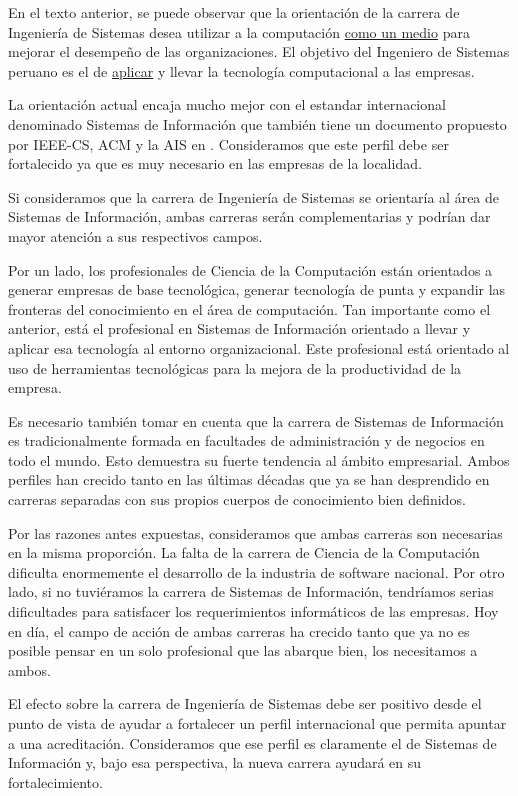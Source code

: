 En el texto anterior, se puede observar que la orientación de la carrera de Ingenierí­a de Sistemas desea utilizar a la computación \underline{como un medio} para mejorar el desempeño de las organizaciones. El objetivo del Ingeniero de Sistemas peruano es el de \underline{aplicar} y llevar la tecnologí­a computacional a las empresas.

La orientación actual encaja mucho mejor con el estandar
internacional denominado Sistemas de Información que también tiene
un documento propuesto por IEEE-CS, ACM y la \ac{AIS} en
\cite{InformationSystems2002Journal}. Consideramos que este perfil debe ser
fortalecido ya que es muy necesario en las empresas de la localidad.

Si consideramos que la carrera de Ingenierí­a de Sistemas se
orientarí­a al área de Sistemas de Información, ambas carreras serán
complementarias y podrí­an dar mayor atención a sus respectivos
campos.

Por un lado, los profesionales de Ciencia de la Computación están orientados a generar empresas
de base tecnológica, generar tecnologí­a de punta y expandir las
fronteras del conocimiento en el área de computación. Tan importante
como el anterior, está el profesional en Sistemas de Información
orientado a llevar y aplicar esa tecnologí­a al entorno organizacional. Este profesional está orientado al uso de
herramientas tecnológicas para la mejora de la productividad de la empresa.

Es necesario también tomar en cuenta que la carrera de Sistemas de Información es tradicionalmente 
formada en facultades de administración y de negocios en todo el mundo. Esto demuestra su fuerte 
tendencia al ámbito empresarial. Ambos perfiles han crecido tanto en las últimas décadas que ya se 
han desprendido en carreras separadas con sus propios cuerpos de conocimiento bien definidos.

Por las razones antes expuestas, consideramos que ambas carreras son necesarias en la misma proporción. 
La falta de la carrera de Ciencia de la Computación dificulta enormemente el desarrollo de la industria de 
software nacional. Por otro lado, si no tuviéramos la carrera de Sistemas de Información, tendrí­amos 
serias dificultades para satisfacer los requerimientos informáticos de las empresas. Hoy en dí­a, el 
campo de acción de ambas carreras ha crecido tanto que ya no es posible pensar en un solo profesional 
que las abarque bien, los necesitamos a ambos.

El efecto sobre la carrera de Ingenierí­a de Sistemas debe ser positivo desde el punto de vista de 
ayudar a fortalecer un perfil internacional que permita apuntar a una acreditación. Consideramos 
que ese perfil es claramente el de Sistemas de Información y, bajo esa perspectiva, la nueva 
carrera ayudará en su fortalecimiento.
